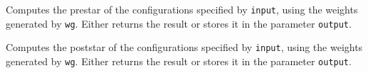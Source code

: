 \begin{functionlist}
    Computes the prestar of the configurations specified by
    \texttt{input}, using the weights generated by \texttt{wg}. Either
    returns the result or stores it in the parameter \texttt{output}.

    Computes the poststar of the configurations specified by
    \texttt{input}, using the weights generated by \texttt{wg}. Either
    returns the result or stores it in the parameter \texttt{output}.
\end{functionlist}
